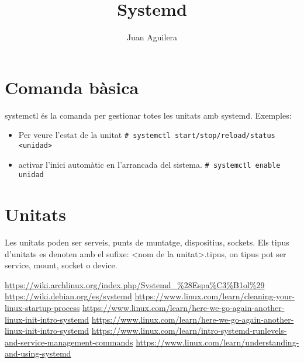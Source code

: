 \documentclass[a4paper]{article}
\begin{document}
\title{Systemd}
\author{Juan Aguilera}
\maketitle

\begin{comment}
oddsidemargin \the\oddsidemargin \newline
textwidth \the\textwidth \newline
marginparsep \the\marginparsep \newline
marginparwidth \the\marginparwidth \newline
hoffset \the\hoffset \newline
paperwidth \the\paperwidth 
\end{comment}

\section{Comanda bàsica}
systemctl és la comanda per gestionar totes les unitats amb systemd. Exemples:
\begin{itemize}
	\item Per veure l'estat de la unitat  \newline
	\verb+# systemctl start/stop/reload/status <unidad>+ 
	\item activar l'inici automàtic en l'arrancada del sistema. \newline
	\verb+# systemctl enable unidad+ 
\end{itemize}

\section{Unitats}

Les unitats poden ser serveis, punts de muntatge, dispositius, sockets. Els tipus d'unitats es denoten amb el sufixe: <nom de la unitat>.tipus, on tipus pot ser service, mount, socket o device.

\begin{thebibliography}{99}
	 \url{https://wiki.archlinux.org/index.php/Systemd_%28Espa%C3%B1ol%29}
	 \url{https://wiki.debian.org/es/systemd}
	 \url{https://www.linux.com/learn/cleaning-your-linux-startup-process}
	 \url{https://www.linux.com/learn/here-we-go-again-another-linux-init-intro-systemd}
	 \url{https://www.linux.com/learn/here-we-go-again-another-linux-init-intro-systemd}
	 \url{https://www.linux.com/learn/intro-systemd-runlevels-and-service-management-commands}
	 \url{https://www.linux.com/learn/understanding-and-using-systemd}
		

	
\end{thebibliography}
\end{document}
